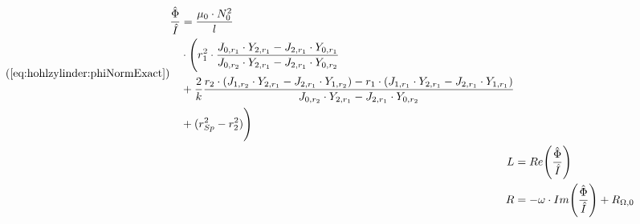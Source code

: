 {\begin{minipage}[t]{0.33\textwidth}
        \begin{align}
            \tag{\ref{eq:hohlzylinder:phiNormExact}}
            \begin{split}
            \frac{\hat{\Phi}}{\hat{I}} & = \frac{\mu_0 \cdot N_0^2}{l} \\
                                       & \cdot \Biggl( r_1^2 \cdot \frac{J_{0,r_1} \cdot Y_{2,r_1} - J_{2,r_1} \cdot Y_{0,r_1}}{J_{0,r_2} \cdot Y_{2,r_1} - J_{2,r_1} \cdot Y_{0,r_2}} \\
                                       & + \frac{2}{k} \frac{r_2 \cdot (J_{1,r_2} \cdot Y_{2,r_1} - J_{2,r_1} \cdot Y_{1,r_2}) - r_1 \cdot (J_{1,r_1} \cdot Y_{2,r_1} - J_{2,r_1} \cdot Y_{1,r_1})}{J_{0,r_2} \cdot Y_{2,r_1} - J_{2,r_1} \cdot Y_{0,r_2}} \\
                                       & + (r_{Sp}^2 - r_2^2) \Biggr)
            \end{split} \\
            L & = Re \Biggl(\frac{\hat{\Phi}}{\hat{I}} \Biggr) \\
            R & = - \omega \cdot Im \Biggl(\frac{\hat{\Phi}}{\hat{I}} \Biggr) + R_{\Omega,0}
        \end{align}

        \vspace{1em}

        \begin{minipage}[c][][b]{0.5\textwidth}
            \vspace{0pt}
            
        \end{minipage}%
        \begin{minipage}[c][][b]{0.5\textwidth}
            \vspace{0pt}
            
        \end{minipage}
	\end{minipage}%
	\begin{minipage}[t]{0.67\textwidth}
        \vspace{0pt}
        \resizebox{.95\textwidth}{!}{}
        \label{fig:st:freq:L}
        \resizebox{.95\textwidth}{!}{}
        \label{fig:st:freq:R}
	\end{minipage}

}

